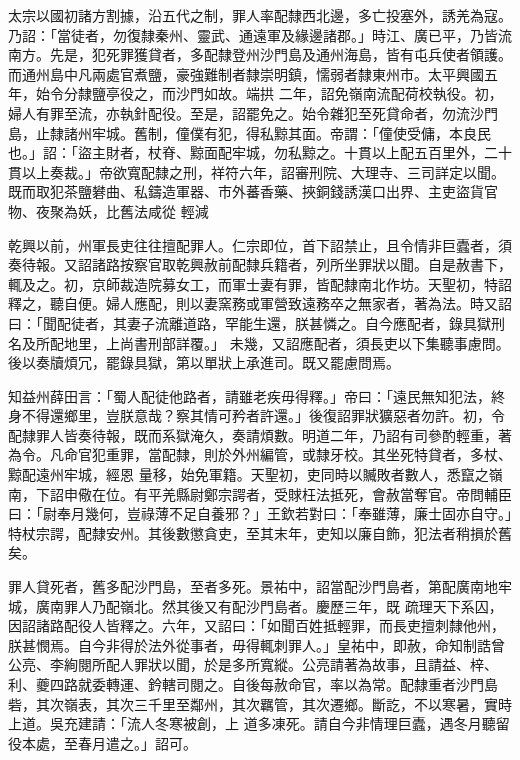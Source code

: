 \begin{pinyinscope}
 太宗以國初諸方割據，沿五代之制，罪人率配隸西北邊，多亡投塞外，誘羌為寇。乃詔：「當徒者，勿復隸秦州、靈武、通遠軍及緣邊諸郡。」時江、廣已平，乃皆流南方。先是，犯死罪獲貸者，多配隸登州沙門島及通州海島，皆有屯兵使者領護。而通州島中凡兩處官煮鹽，豪強難制者隸崇明鎮，懦弱者隸東州市。太平興國五年，始令分隸鹽亭役之，而沙門如故。端拱
 二年，詔免嶺南流配荷校執役。初，婦人有罪至流，亦執針配役。至是，詔罷免之。始令雜犯至死貸命者，勿流沙門島，止隸諸州牢城。舊制，僮僕有犯，得私黥其面。帝謂：「僮使受傭，本良民也。」詔：「盜主財者，杖脊、黥面配牢城，勿私黥之。十貫以上配五百里外，二十貫以上奏裁。」帝欲寬配隸之刑，祥符六年，詔審刑院、大理寺、三司詳定以聞。既而取犯茶鹽礬曲、私鑄造軍器、市外蕃香藥、挾銅錢誘漢口出界、主吏盜貨官物、夜聚為妖，比舊法咸從
 輕減



 乾興以前，州軍長吏往往擅配罪人。仁宗即位，首下詔禁止，且令情非巨蠹者，須奏待報。又詔諸路按察官取乾興赦前配隸兵籍者，列所坐罪狀以聞。自是赦書下，輒及之。初，京師裁造院募女工，而軍士妻有罪，皆配隸南北作坊。天聖初，特詔釋之，聽自便。婦人應配，則以妻窯務或軍營致遠務卒之無家者，著為法。時又詔曰：「聞配徒者，其妻子流離道路，罕能生還，朕甚憐之。自今應配者，錄具獄刑名及所配地里，上尚書刑部詳覆。」
 未幾，又詔應配者，須長吏以下集聽事慮問。後以奏牘煩冗，罷錄具獄，第以單狀上承進司。既又罷慮問焉。



 知益州薛田言：「蜀人配徒他路者，請雖老疾毋得釋。」帝曰：「遠民無知犯法，終身不得還鄉里，豈朕意哉？察其情可矜者許還。」後復詔罪狀獷惡者勿許。初，令配隸罪人皆奏待報，既而系獄淹久，奏請煩數。明道二年，乃詔有司參酌輕重，著為令。凡命官犯重罪，當配隸，則於外州編管，或隸牙校。其坐死特貸者，多杖、黥配遠州牢城，經恩
 量移，始免軍籍。天聖初，吏同時以贓敗者數人，悉竄之嶺南，下詔申儆在位。有平羌縣尉鄭宗諤者，受賕枉法抵死，會赦當奪官。帝問輔臣曰：「尉奉月幾何，豈祿薄不足自養邪？」王欽若對曰：「奉雖薄，廉士固亦自守。」特杖宗諤，配隸安州。其後數懲貪吏，至其末年，吏知以廉自飾，犯法者稍損於舊矣。



 罪人貸死者，舊多配沙門島，至者多死。景祐中，詔當配沙門島者，第配廣南地牢城，廣南罪人乃配嶺北。然其後又有配沙門島者。慶歷三年，既
 疏理天下系囚，因詔諸路配役人皆釋之。六年，又詔曰：「如聞百姓抵輕罪，而長吏擅刺隸他州，朕甚憫焉。自今非得於法外從事者，毋得輒刺罪人。」皇祐中，即赦，命知制誥曾公亮、李絢閱所配人罪狀以聞，於是多所寬縱。公亮請著為故事，且請益、梓、利、夔四路就委轉運、鈐轄司閱之。自後每赦命官，率以為常。配隸重者沙門島砦，其次嶺表，其次三千里至鄰州，其次羈管，其次遷鄉。斷訖，不以寒暑，實時上道。吳充建請：「流人冬寒被創，上
 道多凍死。請自今非情理巨蠹，遇冬月聽留役本處，至春月遣之。」詔可。




\end{pinyinscope}
